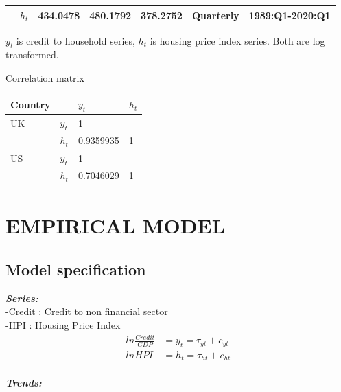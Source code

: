 \documentclass[12pt]{article}
\begin{document}
\begin{outline}[enumerate]
\begin{center}
\begin{threeparttable}
\begin{tabular}{@{}llSSSll@{}}
					& $h_t$ & 434.0478 & 480.1792 & 378.2752 & Quarterly & 1989:Q1-2020:Q1\\[2pt] 
					
					\bottomrule
				\end{tabular}
				\begin{tablenotes}
					\small
					\item $y_t$ is credit to household series, $h_t$ is housing price index series. Both are log transformed. \\
				\end{tablenotes}
			\end{threeparttable}

		
		


			\begin{threeparttable}
				\caption {\label{tab:table2} Correlation matrix}
				\begin{tabular}{@{}llll@{}}
					\toprule
					Country & & $y_t$ & $h_t$ \\
					\midrule
					UK & $y_t$ & 1 &  \\[2pt] 
					
					& $h_t$ & 0.9359935 & 1 \\[2pt] 
					\midrule
					US & $y_t$ & 1 &  \\[2pt] 
					
					& $h_t$ & 0.7046029 & 1 \\[2pt] 
					
					\bottomrule
				\end{tabular}
			\end{threeparttable}
			\end{center}
		
		\clearpage
		\section {EMPIRICAL MODEL}
		\subsection{Model specification}
		
		\textbf{\textit{Series:}} \\
		-Credit : Credit to non financial sector\\
		-HPI : Housing Price Index
		\begin{align}
		ln \frac{Credit}{GDP} &= y_t = \tau_{yt} + c_{yt}
		\\
		ln HPI &= h_t = \tau_{ht} + c_{ht}
		\end{align}
		\\
		\textbf{\textit{Trends:}}
		

\end{outline}
\end{document}

